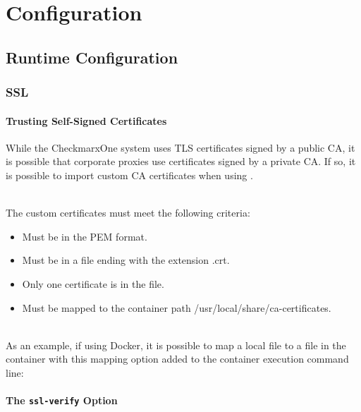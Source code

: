 \chapter{Configuration}


\section{Runtime Configuration}\label{sec:runtime-config}

\subsection{SSL}

\subsubsection{Trusting Self-Signed Certificates}\label{sec:self-signed-certs}

While the CheckmarxOne system uses TLS certificates signed by a public CA, it is possible that
corporate proxies use certificates signed by a private CA. If so, it is possible to
import custom CA certificates when using \cxoneflow.

\noindent\\The custom certificates must meet the following criteria:

\begin{itemize}
    \item Must be in the PEM format.
    \item Must be in a file ending with the extension .crt.
    \item Only one certificate is in the file.
    \item Must be mapped to the container path /usr/local/share/ca-certificates.
\end{itemize}


\noindent\\As an example, if using Docker, it is possible to map a local file to a file in the container with this mapping option added to the container execution command line:


\subsubsection{The \texttt{ssl-verify} Option}\label{sec:ssl-verify-general}

